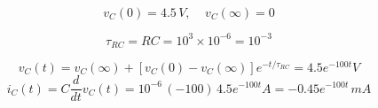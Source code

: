 \begin{enumerate}
  \[
  v_C(0)=4.5\,V,\;\;\;\;v_C(\infty)=0
  \]

  \[
  \tau_{RC}=RC=10^3\times 10^{-6}=10^{-3}
  \]
  
  \[
  v_C(t)=v_C(\infty)+[v_C(0)-v_C(\infty)]e^{-t/\tau_{RC}}=4.5 e^{-100 t}V
  \]
  \[
  i_C(t)=C\frac{d}{dt}v_C(t)=10^{-6}\,(-100)\, 4.5e^{-100t} A=-0.45 e^{-100t}\,mA
  \]

\begin{comment}

\item In the circuit below, the filter composed of $L$, $C_1$ and $C_2$
  between the source $v(t)$ and the load $R_L$ is to pass the fundamental
  frequency $\omega_0=1000$ without attenuation but completely block the 2nd 
  harmonic $2\omega_0=2000$. Given $L=25\,mH$,  find $C_1$ and $C_2$.

  \htmladdimg{../Problems2.png}

  {\bf Solution} Find the total impedance of the filter branch:
  \begin{eqnarray}
    Z(\omega)&=&\frac{j\omega L/j\omega C_1}{j\omega L+1/j\omega C_1}+\frac{1}{j\omega C_2}
    =\frac{j\omega L}{1-\omega^2LC_1}-\frac{j}{\omega C_2}
    \nonumber\\
    &=&j\frac{\omega^2LC_2+\omega^2LC_1-1}{(1-\omega^2LC_1)\omega C_2}
    =j\frac{\omega^2L(C_1+C_2)-1}{(1-\omega^2LC_1)\omega C_2}
    \nonumber
  \end{eqnarray}
  When the denominator is zero, i.e., $\omega^2=1/LC_1$, we get 
  $|Z(\omega)|=\infty$, the filter is an open circuit. Therefore, to 
  completely block $2\omega_0=2000$, $C_1$ needs to satisfy:
  \[
  \frac{1}{\sqrt{LC_1}}=2\times 10^3,\;\;\;\;\mbox{i.e.,}\;\;\;\;
  C_1=\frac{1}{4\times 10^6 \times 25\times 10^-3}=10^{-5}\,F=10\,\mu F
  \]
  When the numerator is zero, i.e., $\omega^2L(C_1+C_2)=1$,  $|Z(\omega)|=0$,
  the filter is a short circuit. Therefore, to pass $\omega_0=1000$ without
  attenuation, $C_1+C_2$ nees to satisfy
  \[
  C_1+C_2=\frac{1}{\omega_0^2L}=\frac{1}{10^6\times 25\times 10^{-3}}=40\times 10^{-6}=40\,\mu F
  \]
  i.e.,
  \[
  C_2=40\,\mu F-C_1=40\,\mu F-10\,\mj F=30\,\mu F
  \]

\item In the circuit below, $R_1=3\,k\Omega$, $R_2=2\,k\Omage$, $C=1\,\mu F$, 
  $L=10\,mH$, $I_0=5\,mA$,and $v_0(t)=10\sin(10^4t)\,V$. Find the 
  current $i(t)$ through $R_2$.

  \htmladdimg{../Problems5.png}
    
  {\bf Solution} Use superposition. First let $v_0(t)=0$. 
  \[
  i'(t)=\frac{R_1}{R_1+R_2}I_0=\frac{2}{2+3}\;3\,mA=3\,mA
  \]
  Next let $I_0=0$ (open-circuit). 
  \[
  \frac{1}{\omega C}=\frac{1}{10^4\times 10^{-6}}=10^2,
  \;\;\;\;\;
  \omega L=10^4\times 10^{-2}=10^2
  \]
  As $j\omega L-1/j\omega C=0$, the $L$ and $C$ form a series resonant
  circuit with zero impedance, we have
  \[
  i''(t)=\frac{v_0(t)}{R_2}=5\,\sin(10^4t)\,mA
  \]
  \[
  i(t)=i'(t)+i''(t)=3+5=8\,mA
  \]


\end{comment}
\end{enumerate}
